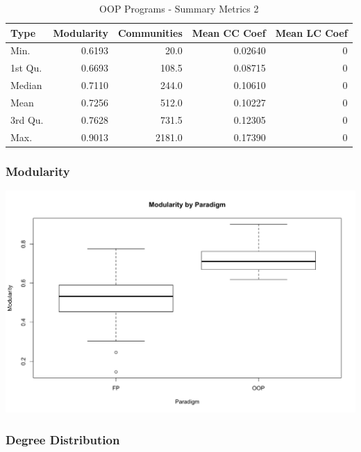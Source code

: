 \documentclass[12pt, a4paper]{article}
\begin{document}
\begin{longtable}[H]{l r r r r}
    \caption{OOP Programs - Summary Metrics 2}\label{table:oop_sum_metrics_2}\\
        Type & Modularity & Communities & Mean CC Coef & Mean LC Coef \\
        \hline            
        \endhead
        Min.    & 0.6193 &   20.0 & 0.02640 & 0 \\    
        1st Qu. & 0.6693 &  108.5 & 0.08715 & 0 \\    
        Median  & 0.7110 &  244.0 & 0.10610 & 0 \\    
        Mean    & 0.7256 &  512.0 & 0.10227 & 0 \\    
        3rd Qu. & 0.7628 &  731.5 & 0.12305 & 0 \\    
        Max.    & 0.9013 & 2181.0 & 0.17390 & 0 
\end{longtable}

\subsubsection{Modularity}

\begin{minipage}[t]{\linewidth}
    \includegraphics[width=\textwidth]{modularity_paradigm.png}
    \captionsetup{type=figure}
    \label{fig:modularity_paradigm}
  \end{minipage}


\subsubsection{Degree Distribution}
  
\end{document}
